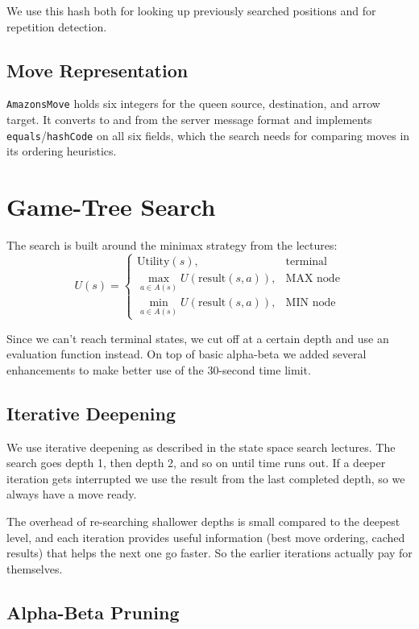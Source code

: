 \documentclass[12pt, letterpaper]{article}
\begin{document}
We use this hash both for looking up previously searched positions and for repetition detection.

\subsection{Move Representation}

\texttt{AmazonsMove} holds six integers for the queen source, destination, and arrow target. It converts to and from the server message format and implements \texttt{equals}/\texttt{hashCode} on all six fields, which the search needs for comparing moves in its ordering heuristics.


\section{Game-Tree Search}

The search is built around the minimax strategy from the lectures:
\[
U(s) = \begin{cases}
\text{Utility}(s), & \text{terminal} \\
\max_{a \in A(s)} U(\text{result}(s, a)), & \text{MAX node} \\
\min_{a \in A(s)} U(\text{result}(s, a)), & \text{MIN node}
\end{cases}
\]

Since we can't reach terminal states, we cut off at a certain depth and use an evaluation function instead. On top of basic alpha-beta we added several enhancements to make better use of the 30-second time limit.

\subsection{Iterative Deepening}

We use iterative deepening as described in the state space search lectures. The search goes depth 1, then depth 2, and so on until time runs out. If a deeper iteration gets interrupted we use the result from the last completed depth, so we always have a move ready.

The overhead of re-searching shallower depths is small compared to the deepest level, and each iteration provides useful information (best move ordering, cached results) that helps the next one go faster. So the earlier iterations actually pay for themselves.

\subsection{Alpha-Beta Pruning}
\end{document}
